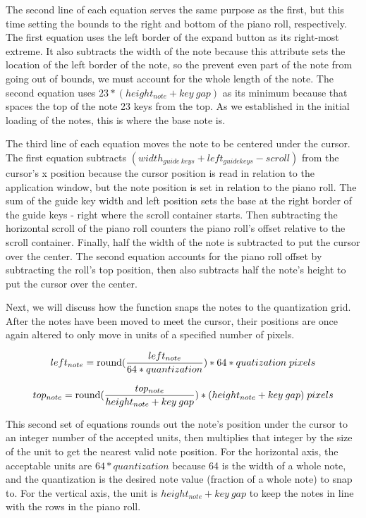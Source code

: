 The second line of each equation serves the same purpose as the first, but this time setting the
bounds to the right and bottom of the piano roll, respectively. The first equation uses the left
border of the expand button as its right-most extreme. It also subtracts the width of the note
because this attribute sets the location of the left border of the note, so the prevent even part
of the note from going out of bounds, we must account for the whole length of the note. The second
equation uses $ 23*(height_{note} + key\: gap) $ as its minimum because that spaces the top of the
note 23 keys from the top. As we established in the initial loading of the notes, this is where the
base note is.

The third line of each equation moves the note to be centered under the cursor. The first equation
subtracts $ (width_{guide\:keys} +left_{guide keys} - scroll) $ from the cursor’s x position because
the cursor position is read in relation to the application window, but the note position is set in
relation to the piano roll. The sum of the guide key width and left position sets the base at the
right border of the guide keys - right where the scroll container starts. Then subtracting the
horizontal scroll of the piano roll counters the piano roll’s offset relative to the scroll
container. Finally, half the width of the note is subtracted to put the cursor over the center. The
second equation accounts for the piano roll offset by subtracting the roll’s top position, then
also subtracts half the note’s height to put the cursor over the center.

Next, we will discuss how the function snaps the notes to the quantization grid. After the notes
have been moved to meet the cursor, their positions are once again altered to only move in units of
a specified number of pixels.

\begin{equation} \label{vert_snap}
  left_{note} = \operatorname{round}(\frac{left_{note}}{64 * quantization}) * 64 * quatization \;pixels
\end{equation}

\begin{equation} \label{horz_snap}
  top_{note} = \operatorname{round}(\frac{top_{note}}{height_{note} + key\:gap}) * (height_{note} + key\:gap) \;pixels
\end{equation}

This second set of equations rounds out the note’s position under the cursor to an integer number
of the accepted units, then multiplies that integer by the size of the unit to get the nearest
valid note position. For the horizontal axis, the acceptable units are $ 64 * quantization $
because 64 is the width of a whole note, and the quantization is the desired note value (fraction
of a whole note) to snap to. For the vertical axis, the unit is $ height_{note} + key\:gap $ to
keep the notes in line with the rows in the piano roll.

